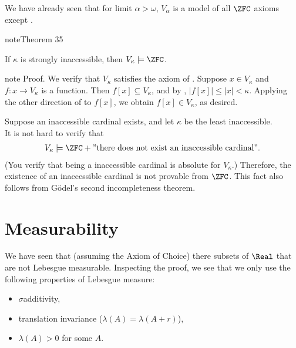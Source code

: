 \documentclass[letterpaper,10pt,english]{jupyterBook}
\begin{document}
\sphinxAtStartPar
We have already seen that for limit \(\alpha > \omega\), \(V_\alpha\) is a model of all \(\ZFC\) axioms except .
\label{large_cardinals:thm-inaccessible-ZFC}
\begin{sphinxadmonition}{note}{Theorem 35}



\sphinxAtStartPar
If \(\kappa\) is strongly inaccessible, then \(V_\kappa \models \ZFC\).
\end{sphinxadmonition}

\begin{sphinxadmonition}{note}
\sphinxAtStartPar
Proof. We verify that \(V_\kappa\) satisfies the axiom of .
Suppose \(x \in V_\kappa\) and \(f:x \to V_\kappa\) is a function. Then \(f[x] \subseteq V_\kappa\), and by {\hyperref[\detokenize{large_cardinals:prop-inaccessible-cardinality}]{}}, \(|f[x]| \leq |x| < \kappa\). Applying the other direction of {\hyperref[\detokenize{large_cardinals:prop-inaccessible-cardinality}]{}} to \(f[x]\), we obtain \(f[x] \in V_\kappa\), as desired.
\end{sphinxadmonition}

\sphinxAtStartPar
Suppose an inaccessible cardinal exists, and let \(\kappa\) be the least inaccessible.\\
It is not hard to verify that
\begin{equation*}
\begin{split}
V_\kappa \models \ZFC + \text{''there does not exist an inaccessible cardinal''}.
\end{split}
\end{equation*}
\sphinxAtStartPar
(You verify that being a inaccessible cardinal is absolute for \(V_\kappa\).) Therefore, the existence of an inaccessible cardinal is not provable from \(\ZFC\). This fact also follows from Gödel’s second incompleteness theorem.


\section{Measurability}
\label{\detokenize{large_cardinals:measurability}}
\sphinxAtStartPar
We have seen that (assuming the Axiom of Choice) there subsets of \(\Real\) that are not Lebesgue measurable. Inspecting the proof, we see that we only use the following properties of Lebesgue measure:
\begin{itemize}
\item {} 
\sphinxAtStartPar
\(\sigma\)\sphinxhyphen{}additivity,

\item {} 
\sphinxAtStartPar
translation invariance (\(\lambda(A) = \lambda(A+r)\)),

\item {} 
\sphinxAtStartPar
\(\lambda(A) > 0\) for some \(A\).

\end{itemize}
\end{document}
